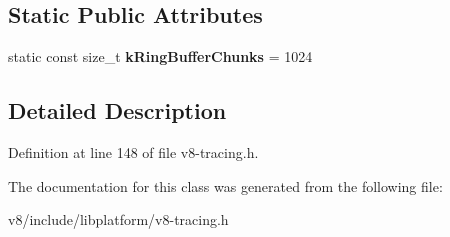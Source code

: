 \subsection*{Static Public Attributes}
\begin{DoxyCompactItemize}
\item 
\mbox{\label{classv8_1_1platform_1_1tracing_1_1TraceBuffer_a4957aae5f855daac2d581de0734f0d49}} 
static const size\+\_\+t {\bfseries k\+Ring\+Buffer\+Chunks} = 1024
\end{DoxyCompactItemize}


\subsection{Detailed Description}


Definition at line 148 of file v8-\/tracing.\+h.



The documentation for this class was generated from the following file\+:\begin{DoxyCompactItemize}
\item 
v8/include/libplatform/v8-\/tracing.\+h\end{DoxyCompactItemize}

